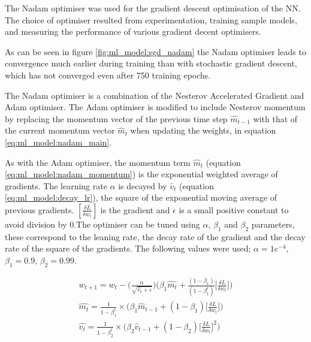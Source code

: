 The Nadam optimiser was used for the gradient descent optimisation of the NN. The choice of optimiser resulted from experimentation, training sample models, and measuring the performance of various gradient decent optimisers.

As can be seen in figure \ref{fig:ml_model:sgd_nadam} the Nadam optimiser leads to convergence much earlier during training than with stochastic gradient descent, which has not converged even after 750 training epochs.


The Nadam optimiser is a combination of the Nesterov Accelerated Gradient and Adam optimiser. The Adam optimiser is modified to include Nesterov momentum by replacing the momentum vector of the previous time step $\hat{m}_{t-1}$ with that of the current momentum vector $\hat{m}_t$ when updating the weights, in equation \ref{eq:ml_model:nadam_main}.

As with the Adam optimiser, the momentum term $\hat{m}_t$ (equation \ref{eq:ml_model:nadam_momentum}) is the exponential weighted average of gradients. The learning rate $\alpha$ is decayed by $\hat{v}_t$ (equation \ref{eq:ml_model:decay_lr}), the square of the exponential moving average of previous gradients. $ [\frac{\delta L}{\delta w_t}]$ is the gradient and $\epsilon$ is a small positive constant to avoid division by 0.The optimiser can be tuned using $\alpha$, $\beta_1$ and $\beta_2$ parameters, these correspond to the leaning rate, the decay rate of the gradient and the decay rate of the square of the gradients. The following values were used; $\alpha = 1e^{-4}$, $\beta_1 = 0.9$, $\beta_2 = 0.99$.







\begin{gather}
    w_{t+1} = w_t - \big( \frac{\alpha}{\sqrt{\hat{v_t} + \epsilon}} \big) \Bigg( \beta_{1} \hat{m_{t}} + \frac{(1 - \beta_1)}{(1 - \beta^{t}_1)} \bigg[\frac{\delta L}{\delta w_t}\bigg] \Bigg) \label{eq:ml_model:nadam_main} \\ 
    \hat{m_t} = \frac{1}{1 - \beta^{t}_1} \times \Bigg( \beta_{1} \hat{m}_{t-1} + (1 - \beta_1) \bigg[\frac{\delta L}{\delta w_t}\bigg] \Bigg) \label{eq:ml_model:nadam_momentum} \\
    \hat{v_t} = \frac{1}{1 - \beta^{t}_2} \times \Bigg( \beta_2 \hat{v}_{t-1} + ( 1- \beta_2) \bigg[\frac{\delta L}{\delta w_t}\bigg]^2 \Bigg) \label{eq:ml_model:decay_lr}
\end{gather}





